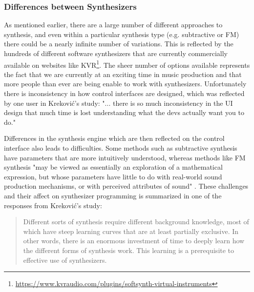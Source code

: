 \subsubsection{Differences between Synthesizers}
As mentioned earlier, there are a large number of different approaches to synthesis, and even within a particular synthesis type (e.g. subtractive or FM) there could be a nearly infinite number of variations. This is reflected by the hundreds of different software synthesizers that are currently commercially available on websites like KVR\footnote{\url{https://www.kvraudio.com/plugins/softsynth-virtual-instruments}}. The sheer number of options available represents the fact that we are currently at an exciting time in music production and that more people than ever are being enable to work with synthesizers. Unfortunately there is inconsistency in how control interfaces are designed, which was reflected by one user in Krekovi\'{c}'s study: "... there is so much inconsistency in the UI design that much time is lost understanding what the devs actually want you to do."

Differences in the synthesis engine which are then reflected on the control interface also leads to difficulties. Some methods such as subtractive synthesis have parameters that are more intuitively understood, whereas methods like FM synthesis "may be viewed as essentially an exploration of a mathematical expression, but whose parameters have little to do with real-world sound production mechanisms, or with perceived attributes of sound" \cite{seago2013new}. These challenges and their affect on synthesizer programming is summarized in one of the responses from Krekovi\'{c}'s study:

\begin{quote}
    Different sorts of synthesis require different background knowledge, most of which have steep learning curves that are at least partially exclusive. In other words, there is an enormous investment of time to deeply learn how the different forms of synthesis work. This learning is a prerequisite to effective use of synthesizers.
\end{quote}

